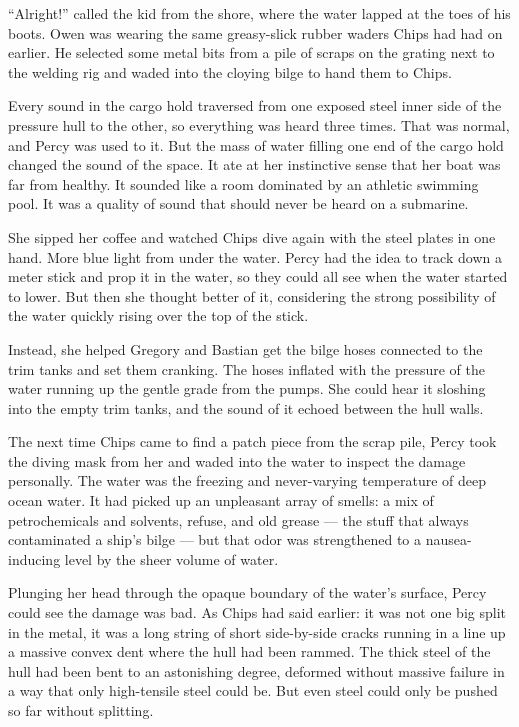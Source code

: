 \documentclass[
]{scrbook}
\begin{document}
``Alright!'' called the kid from the shore, where the water lapped at
the toes of his boots. Owen was wearing the same greasy-slick rubber
waders Chips had had on earlier. He selected some metal bits from a pile
of scraps on the grating next to the welding rig and waded into the
cloying bilge to hand them to Chips.

Every sound in the cargo hold traversed from one exposed steel inner
side of the pressure hull to the other, so everything was heard three
times. That was normal, and Percy was used to it. But the mass of water
filling one end of the cargo hold changed the sound of the space. It ate
at her instinctive sense that her boat was far from healthy. It sounded
like a room dominated by an athletic swimming pool. It was a quality of
sound that should never be heard on a submarine.

She sipped her coffee and watched Chips dive again with the steel plates
in one hand. More blue light from under the water. Percy had the idea to
track down a meter stick and prop it in the water, so they could all see
when the water started to lower. But then she thought better of it,
considering the strong possibility of the water quickly rising over the
top of the stick.

Instead, she helped Gregory and Bastian get the bilge hoses connected to
the trim tanks and set them cranking. The hoses inflated with the
pressure of the water running up the gentle grade from the pumps. She
could hear it sloshing into the empty trim tanks, and the sound of it
echoed between the hull walls.

\bigskip

The next time Chips came to find a patch piece from the scrap pile,
Percy took the diving mask from her and waded into the water to inspect
the damage personally. The water was the freezing and never-varying
temperature of deep ocean water. It had picked up an unpleasant array of
smells: a mix of petrochemicals and solvents, refuse, and old grease ---
the stuff that always contaminated a ship's bilge --- but that odor was
strengthened to a nausea-inducing level by the sheer volume of water.

Plunging her head through the opaque boundary of the water's surface,
Percy could see the damage was bad. As Chips had said earlier: it was
not one big split in the metal, it was a long string of short
side-by-side cracks running in a line up a massive convex dent where the
hull had been rammed. The thick steel of the hull had been bent to an
astonishing degree, deformed without massive failure in a way that only
high-tensile steel could be. But even steel could only be pushed so far
without splitting.
\end{document}
